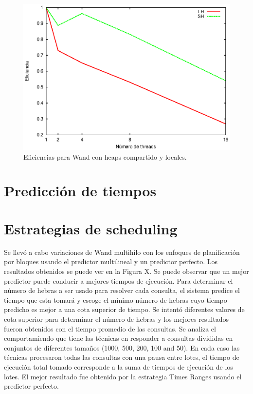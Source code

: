 \begin{figure}[!ht]
\centering
\includegraphics[scale=.75]{images/eficiencias_wand.eps}
\caption{Eficiencias para Wand con heaps compartido y locales.}
\label{fig:eficiencias_wand}
\end{figure}

\section{Predicción de tiempos}
\label{evaluacionexperimental:predicciontiempos}

\section{Estrategias de scheduling}
\label{evaluacionexperimental:estrategiasscheduling}
Se llevó a cabo variaciones de Wand multihilo con los enfoques de planificación por bloques usando el predictor multilineal y un predictor perfecto. Los resultados obtenidos se puede ver en la Figura X. Se puede observar que un mejor predictor puede conducir a mejores tiempos de ejecución. Para determinar el número de hebras a ser usado para resolver cada consulta, el sistema predice el tiempo que esta tomará y escoge el mínimo número de hebras cuyo tiempo predicho es mejor a una cota superior de tiempo. Se intentó diferentes valores de cota superior para determinar el número de hebras y los mejores resultados fueron obtenidos con el tiempo promedio de las consultas. Se analiza el comportamiendo que tiene las técnicas en responder a consultas divididas en conjuntos de diferentes tamaños (1000, 500, 200, 100 and 50). En cada caso las técnicas procesaron todas las consultas con una pausa entre lotes, el tiempo de ejecución total tomado corresponde a la suma de tiempos de ejecución de los lotes. El mejor resultado fue obtenido por la estrategia Times Ranges usando el predictor perfecto. 

